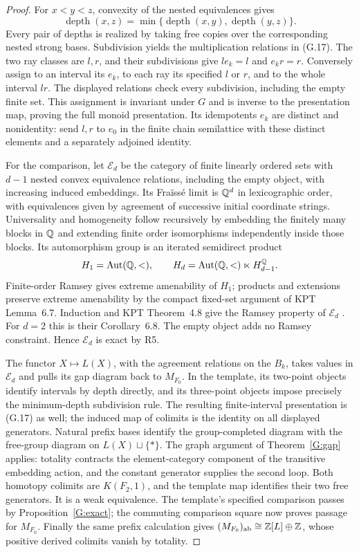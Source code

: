 \begin{proof}
For $x<y<z$, convexity of the nested equivalences gives
\[
 \operatorname{depth}(x,z)=
 \min\{\operatorname{depth}(x,y),
          \operatorname{depth}(y,z)\}.
\]
Every pair of depths is realized by taking free copies over
the corresponding nested strong bases.  Subdivision yields
the multiplication relations in (G.17).  The two ray classes
are $l,r$, and their subdivisions give $le_k=l$ and $e_kr=r$.
Conversely assign to an interval its $e_k$, to each ray its
specified $l$ or $r$, and to the whole interval $lr$.
The displayed relations check every subdivision, including
the empty finite set.  This assignment is invariant under
$G$ and is inverse to the presentation map, proving the
full monoid presentation.  Its idempotents $e_k$ are distinct
and nonidentity: send $l,r$ to $e_0$ in the finite chain
semilattice with these distinct elements and a separately
adjoined identity.

For the comparison, let $\mathcal E_d$ be the category of
finite linearly ordered sets with $d-1$ nested convex
equivalence relations, including the empty object, with
increasing induced embeddings.  Its Fra\"iss\'e limit is
$\mathbb Q^d$ in lexicographic order, with equivalences given by
agreement of successive initial coordinate strings.
Universality and homogeneity follow recursively by embedding
the finitely many blocks in $\mathbb Q$ and extending finite order
isomorphisms independently inside those blocks.
Its automorphism group is an iterated semidirect product
\[
 H_1=\operatorname{Aut}(\mathbb Q,<),\qquad
 H_d=\operatorname{Aut}(\mathbb Q,<)\ltimes H_{d-1}^{\mathbb Q}.
\]
Finite-order Ramsey gives extreme amenability of $H_1$;
products and extensions preserve extreme amenability by the
compact fixed-set argument of KPT Lemma~6.7.  Induction and
KPT Theorem~4.8 give the Ramsey property of $\mathcal E_d$
\cite{ABKPT2005}.  For $d=2$ this is their Corollary~6.8.
The empty object adds no Ramsey constraint.  Hence
$\mathcal E_d$ is exact by R5.

The functor $X\mapsto L(X)$, with the agreement relations
on the $B_k$, takes values in $\mathcal E_d$ and pulls its
gap diagram back to $M_{F_0}$.  In the template, its two-point
objects identify intervals by depth directly, and its
three-point objects impose precisely the minimum-depth
subdivision rule.  The resulting finite-interval presentation
is (G.17) as well;
the induced map of colimits is the identity on all displayed
generators.  Natural prefix bases identify the group-completed
diagram with the free-group diagram on $L(X)\sqcup\{*\}$.
The graph argument of Theorem~\ref{G:gap} applies: totality
contracts the element-category component of the transitive
embedding action, and the constant generator supplies the
second loop.  Both homotopy colimits are $K(F_2,1)$, and
the template map identifies their two free generators.
It is a weak equivalence.  The template's specified comparison
passes by Proposition~\ref{G:exact}; the commuting comparison
square now proves passage for $M_{F_0}$.
Finally the same prefix calculation gives
$(M_{F_0})_{\mathrm{ab}}\cong\mathbb Z[L]\oplus\mathbb Z$, whose positive
derived colimits vanish by totality.
\end{proof}

